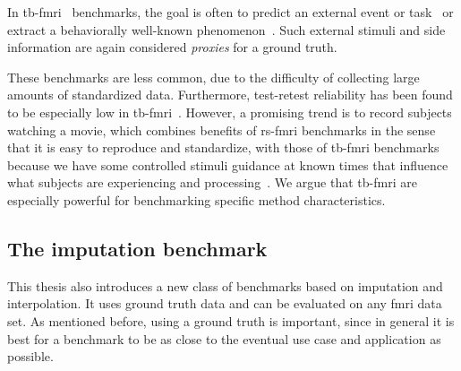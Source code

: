 In \gls{tb-fmri}~\parencite{Gonzalez-Castillo2018} benchmarks, the goal is often to predict an external event or task~\parencite[see e.g.][]{Sakoglu2010, Glerean2012, Shine2015, Monti2017, Sahib2018, Xie2019} or extract a behaviorally well-known phenomenon~\parencite[see e.g.][]{Lan2017, Warnick2018, Li2019b, Ebrahimi2020}.
Such external stimuli and side information are again considered \emph{proxies} for a ground truth.

These benchmarks are less common, due to the difficulty of collecting large amounts of standardized data.
Furthermore, test-retest reliability has been found to be especially low in \gls{tb-fmri}~\parencite{Elliott2020}.
However, a promising trend is to record subjects watching a movie, which combines benefits of \gls{rs-fmri} benchmarks in the sense that it is easy to reproduce and standardize, with those of \gls{tb-fmri} benchmarks because we have some controlled stimuli guidance at known times that influence what subjects are experiencing and processing~\parencite{Eickhoff2020, Finn2021}.
We argue that \gls{tb-fmri} are especially powerful for benchmarking specific method characteristics.

\subsection{The imputation benchmark}
\label{subsec:imputation-benchmark}

This thesis also introduces a new class of benchmarks based on imputation and interpolation.
It uses ground truth data and can be evaluated on any \gls{fmri} data set.
As mentioned before, using a ground truth is important, since in general it is best for a benchmark to be as close to the eventual use case and application as possible.


